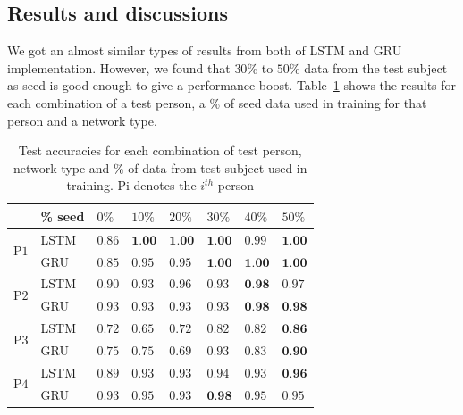 \documentclass[10pt,twocolumn,letterpaper]{article}
\begin{document}
\subsection{Results and discussions}
We got an almost similar types of results from both of LSTM and GRU implementation. However, we found that $30\%$ to $50\%$ data from the test subject as seed is good enough to give a performance boost. Table~\ref{table:result_table} shows the results for each combination of a test person, a \% of seed data used in training for that person and a network type. 
\begin{table}[h]
	\begin{center}
		\begin{tabular}{|m{1em} | m{3em} | m{1.5em} | m{1.5em} | m{1.5em} |m{1.5em} |m{1.5em} |m{1.5em} |}
			\hline
			& \% seed & $0\%$ & $10\%$ & $20\%$ & $30\%$ & $40\%$ & $50\%$\\
			\hline
			\multirow{2}{3.5em}{P$1$}
			& LSTM & $0.86$ & $\textbf{1.00}$ & $\textbf{1.00}$ & $\textbf{1.00}$ & $0.99$ & $\textbf{1.00}$\\
			\cline{2-8}
			& GRU & $0.85$ & $0.95$ & $0.95$ & $\textbf{1.00}$ & $\textbf{1.00}$ & $\textbf{1.00}$\\
			\hline
			\multirow{2}{3.5em}{P$2$}
			& LSTM & $0.90$ & $0.93$ & $0.96$ & $0.93$ & $\textbf{0.98}$ & $0.97$\\
			\cline{2-8}
			& GRU & $0.93$ & $0.93$ & $0.93$ & $0.93$ & $\textbf{0.98}$ & $\textbf{0.98}$\\
			\hline
			\multirow{2}{3.5em}{P$3$}
			& LSTM & $0.72$ & $0.65$ & $0.72$ & $0.82$ & $0.82$ & $\textbf{0.86}$\\
			\cline{2-8}
			& GRU & $0.75$ & $0.75$ & $0.69$ & $0.93$ & $0.83$ & $\textbf{0.90}$\\
			\hline
			\multirow{2}{3.5em}{P$4$}
			& LSTM & $0.89$ & $0.93$ & $0.93$ & $0.94$ & $0.93$ & $\textbf{0.96}$\\
			\cline{2-8}
			& GRU & $0.93$ & $0.95$ & $0.93$ & $\textbf{0.98}$ & $0.95$ & $0.95$\\
			\hline
		\end{tabular}
	\end{center}
	\caption{Test accuracies for each combination of test person, network type and \% of data from test subject used in training. Pi denotes the $i^{th}$ person}
	\label{table:result_table}
\end{table}
\end{document}
